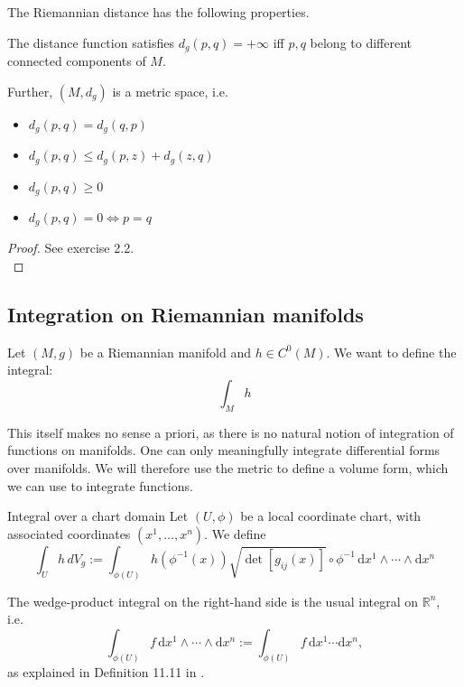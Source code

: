 The Riemannian distance has the following properties.
\begin{colorlem}{}{}
The distance function satisfies \(d_g(p, q) = +\infty\) iff \(p, q\) belong to different connected components of \(M\).

Further, \((M, d_g)\) is a metric space, i.e.
\begin{itemize}
    \item \(d_g(p, q) = d_g(q, p)\)
    \item \(d_g(p, q) \leq d_g(p, z) + d_g(z, q)\)
    \item \(d_g(p, q) \geq 0\)
    \item \(d_g(p, q) = 0 \iff p = q\)
\end{itemize}
\end{colorlem}
\begin{proof}
See exercise 2.2.\\
\end{proof}


\subsection{Integration on Riemannian manifolds}
\label{subsec:integration-riemannian}
Let \((M, g)\) be a Riemannian manifold and \(h \in C^0(M)\). We want to define the integral:
\[
\int_{M} h
\]

This itself makes no sense a priori, as there is no natural notion of integration of functions on manifolds. One can only meaningfully integrate differential forms over manifolds. We will therefore use the metric to define a volume form, which we can use to integrate functions.

\begin{colordef}{Integral over a chart domain}{}
Let \((U, \phi)\) be a local coordinate chart, with associated coordinates \((x^1, \dots, x^n)\). We define
\[
\int_{U} h \, dV_g := \int_{\phi(U)} h \left( \phi^{-1}(x) \right) \sqrt{\det \left[ g_{ij}(x) \right]}\circ\phi^{-1} \, \mathrm{d}x^1 \wedge \cdots \wedge \mathrm{d}x^n
\]
\end{colordef}

The wedge-product integral on the right-hand side is the usual integral on $\mathbb{R}^n$, i.e.\ 
$$\int_{\phi(U)} f\, \mathrm{d}x^1 \wedge \cdots \wedge \mathrm{d}x^n := \int_{\phi(U)} f\, \mathrm{d}x^1 \cdots \mathrm{d}x^n,$$
as explained in Definition 11.11 in \cite{tsakanikas2024dg2}.

